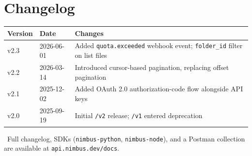 \section{Changelog}
\begin{center}
\begin{tabularx}{\linewidth}{@{}l l X@{}}
\toprule
\rowcolor{panelgray}
\textbf{Version} & \textbf{Date} & \textbf{Changes} \\
\midrule
v2.3 & 2026-06-01 & Added \texttt{quota.exceeded} webhook event; \texttt{folder\_id}
  filter on list files \\
v2.2 & 2026-03-14 & Introduced cursor-based pagination, replacing offset pagination \\
v2.1 & 2025-12-02 & Added OAuth 2.0 authorization-code flow alongside API keys \\
v2.0 & 2025-09-19 & Initial \texttt{/v2} release; \texttt{/v1} entered deprecation \\
\bottomrule
\end{tabularx}
\end{center}

\begin{center}
\begin{tcolorbox}[colback=panelgray,colframe=bordergray,boxrule=0.5pt,arc=3pt,
  left=10pt,right=10pt,top=6pt,bottom=6pt,width=0.92\linewidth]
\small\centering
\infoicon{\faBook}\ Full changelog, SDKs (\texttt{nimbus-python}, \texttt{nimbus-node}),
and a Postman collection are available at \texttt{api.nimbus.dev/docs}.
\end{tcolorbox}
\end{center}
